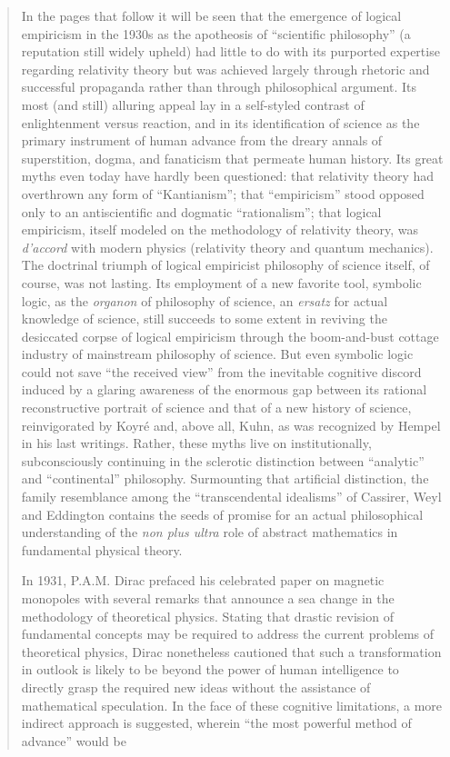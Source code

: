 \begin{quote}
    In the pages that follow it will be seen that the emergence of logical empiricism in the 1930s as the apotheosis of ``scientific philosophy'' (a reputation still widely upheld) had little to do with its purported expertise regarding relativity theory but was achieved largely through rhetoric and successful propaganda rather than through philosophical argument.  Its most (and still) alluring appeal lay in a self-styled contrast of enlightenment versus reaction, and in its identification of science as the primary instrument of human advance from the dreary annals of superstition, dogma, and fanaticism that permeate human history.  Its great myths even today have hardly been questioned: that relativity theory had overthrown any form of ``Kantianism''; that ``empiricism'' stood opposed only to an antiscientific and dogmatic ``rationalism''; that logical empiricism, itself modeled on the methodology of relativity theory, was \emph{d'accord} with modern physics (relativity theory and quantum mechanics).  The doctrinal triumph of logical empiricist philosophy of science itself, of course, was not lasting.  Its employment of a new favorite tool, symbolic logic, as the \emph{organon} of philosophy of science, an \emph{ersatz} for actual knowledge of science, still succeeds to some extent in reviving the desiccated corpse of logical empiricism through the boom-and-bust cottage industry of mainstream philosophy of science.  But even symbolic logic could not save ``the received view'' from the inevitable cognitive discord induced by a glaring awareness of the enormous gap between its rational reconstructive portrait of science and that of a new history of science, reinvigorated by Koyr\'e and, above all, Kuhn, as was recognized by Hempel in his last writings.  Rather, these myths live on institutionally, subconsciously continuing in the sclerotic distinction between ``analytic'' and ``continental'' philosophy.  Surmounting that artificial distinction, the family resemblance among the ``transcendental idealisms'' of Cassirer, Weyl and Eddington contains the seeds of promise for an actual philosophical understanding of the \emph{non plus ultra} role of abstract mathematics in fundamental physical theory.
    
    In 1931, P.A.M. Dirac prefaced his celebrated paper on magnetic monopoles with several remarks that announce a sea change in the methodology of theoretical physics.  Stating that drastic revision of fundamental concepts may be required to address the current problems of theoretical physics, Dirac nonetheless cautioned that such a transformation in outlook is likely to be beyond the power of human intelligence to directly grasp the required new ideas without the assistance of mathematical speculation.  In the face of these cognitive limitations, a more indirect approach is suggested, wherein ``the most powerful method of advance'' would be 
    

\end{quote}
